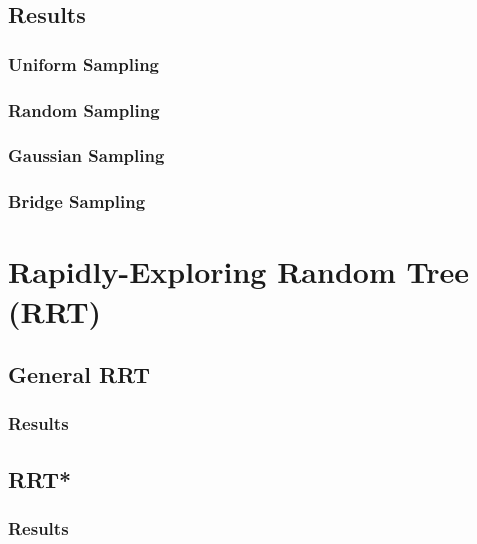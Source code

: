 \documentclass[journal]{IEEEtran}
\begin{document}
    \subsection{Results}
     
    \subsubsection{Uniform Sampling}

    \subsubsection{Random Sampling}

    \subsubsection{Gaussian Sampling}

    \subsubsection{Bridge Sampling}

    \section{Rapidly-Exploring Random Tree (RRT)}

    \subsection{General RRT}

    \subsubsection{Results}

    \subsection{RRT*}

    \subsubsection{Results}

    \newpage



    \printbibliography
\end{document}
